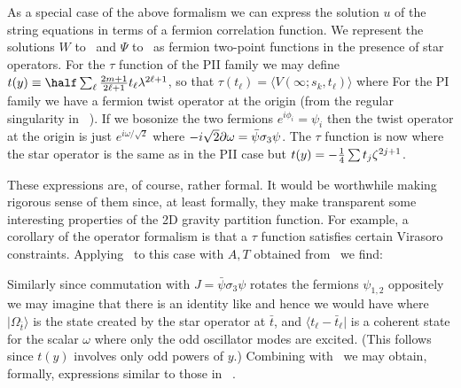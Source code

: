 
As a special case of the above formalism we can express the solution 
$u$ of the string equations in terms of a fermion correlation function. 
We represent the solutions $W$ to \dforz\ and $\Psi$ to \lasaga\ as 
fermion two-point functions in the presence of star operators. For 
the $\tau$ function of the PII family we may define
$t(y)\equiv \half
\sum_\ell {2m+1\over 2\ell +1}t_\ell \lambda^{2\ell+1}$, so that 
$\tau(t_\ell)=\langle V(\infty;s_k,t_\ell)\rangle$ where
\eqn{}
For the PI family we have a fermion twist operator at the origin 
(from the regular singularity in \dforz\ ). If we bosonize the 
two fermions $e^{i\phi_i}=\psi_i$ then the twist 
operator at the origin is just $e^{i\omega/\sqrt{2}}$
where $-i\sqrt{2}\partial\omega=\bar\psi\sigma_3\psi$. The 
$\tau$ function is now 
\eqn{}
where the star operator is the same as in the PII case but 
$t(y)=-{1\over 4}\sum t_j\zeta^{2j+1}$.

These expressions are, of course, rather formal. It would be worthwhile
making rigorous sense of them since, at least formally, they make
transparent some interesting properties of the 2D gravity 
partition function. For example, a corollary of the operator 
formalism is that a $\tau$ function satisfies certain 
Virasoro constraints. Applying \stress\ to this case
with $A,T$ obtained from \dforz\lasaga\ we find:
\eqn{}

Similarly since commutation with $J=\bar\psi\sigma_3\psi$
rotates the fermions $\psi_{1,2}$ oppositely we may imagine 
that there is an identity like
\eqn{}
and hence we would have
\eqn{}
where $|\Omega_{\bar t}\rangle$ is the state created by 
the star operator at $\bar t$, and $\langle t_\ell-\bar t_\ell|$
is a coherent state for the scalar $\omega$ where only the 
odd oscillator modes are excited. (This follows since 
$t(y)$ involves only odd powers of $y$.) Combining with 
\vircni\ we may obtain, formally, expressions similar to those
in \fukuma\dvv\morozovi\morozovii\ .

